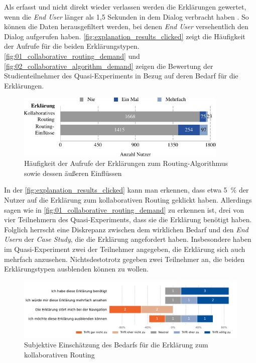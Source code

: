 Als erfasst und nicht direkt wieder verlassen werden die Erklärungen gewertet, wenn die \textit{End User} länger als 1,5 Sekunden in dem Dialog verbracht haben \cite{BAHR2011776}. So können die Daten herausgefiltert werden, bei denen \textit{End User} versehentlich den Dialog aufgerufen haben. \autoref{fig:explanation_results_clicked} zeigt die Häufigkeit der Aufrufe für die beiden Erklärungstypen. \autoref{fig:01_collaborative_routing_demand} und \autoref{fig:02_collaborative_algorithm_demand} zeigen die Bewertung der Studienteilnehmer des Quasi-Experiments in Bezug auf deren Bedarf für die Erklärungen.

\begin{figure}[htb!]
    \centering
    \includegraphics[width=0.9\textwidth]{contents/06_model_evaluation/02_evaluation/res/explanation_results_clicked.pdf}
    \caption{Häufigkeit der Aufrufe der Erklärungen zum Routing-Algorithmus sowie dessen äußeren Einflüssen}
    \label{fig:explanation_results_clicked}
\end{figure}

In der \autoref{fig:explanation_results_clicked} kann man erkennen, dass etwa 5~\% der Nutzer auf die Erklärung zum kollaborativen Routing geklickt haben. Allerdings sagen wie in \autoref{fig:01_collaborative_routing_demand} zu erkennen ist, drei von vier Teilnehmern des Quasi-Experiments, dass sie die Erklärung benötigt haben. Folglich herrscht eine Diskrepanz zwischen dem wirklichen Bedarf und den \textit{End Usern} der \textit{Case Study}, die die Erklärung angefordert haben. Insbesondere haben im Quasi-Experiment zwei der Teilnehmer angegeben, die Erklärung sich auch mehrfach anzusehen. Nichtsdestotrotz gegeben zwei Teilnehmer an, die beiden Erklärungstypen ausblenden können zu wollen.

\begin{figure}[htb!]
    \centering
    \includegraphics[width=\textwidth]{contents/06_model_evaluation/02_evaluation/res/qualitativeFeedback-01_collaborative_routing_demand.pdf}
    \caption{Subjektive Einschätzung des Bedarfs für die Erklärung zum kollaborativen Routing}
    \label{fig:01_collaborative_routing_demand}
\end{figure}

